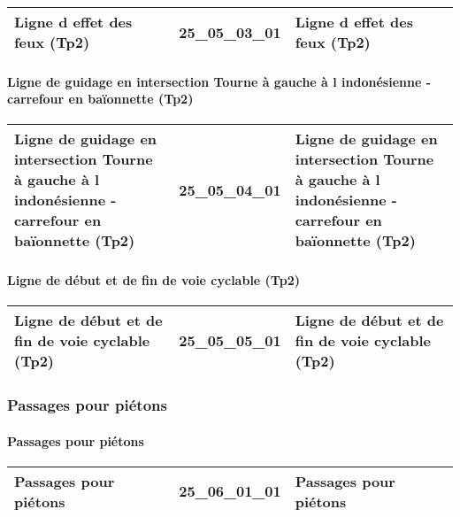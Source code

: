 \documentclass[12pt,titlepage]{book}
\begin{document}
\renewcommand{\arraystretch}{1.2}
\begin{supertabular}{|p{10cm}|c|p{15cm}|}
 Ligne d effet des feux (Tp2) & 25\_05\_03\_01 & Ligne d effet des feux (Tp2)\\
\hline
\end{supertabular}


\paragraph{Ligne de guidage en intersection Tourne à gauche à l indonésienne - carrefour en baïonnette (Tp2)}
\noindent
\vspace{\baselineskip}

\renewcommand{\arraystretch}{1.2}
\begin{supertabular}{|p{10cm}|c|p{15cm}|}
 Ligne de guidage en intersection Tourne à gauche à l indonésienne - carrefour en baïonnette (Tp2) & 25\_05\_04\_01 & Ligne de guidage en intersection Tourne à gauche à l indonésienne - carrefour en baïonnette (Tp2)\\
\hline
\end{supertabular}


\paragraph{Ligne de début et de fin de voie cyclable (Tp2)}
\noindent
\vspace{\baselineskip}

\renewcommand{\arraystretch}{1.2}
\begin{supertabular}{|p{10cm}|c|p{15cm}|}
 Ligne de début et de fin de voie cyclable (Tp2) & 25\_05\_05\_01 & Ligne de début et de fin de voie cyclable (Tp2)\\
\hline
\end{supertabular}

\subsubsection{\large Passages pour piétons}
\paragraph{Passages pour piétons}
\noindent
\vspace{\baselineskip}

\renewcommand{\arraystretch}{1.2}
\begin{supertabular}{|p{10cm}|c|p{15cm}|}
 Passages pour piétons & 25\_06\_01\_01 & Passages pour piétons\\
\hline
\end{supertabular}
\end{document}
